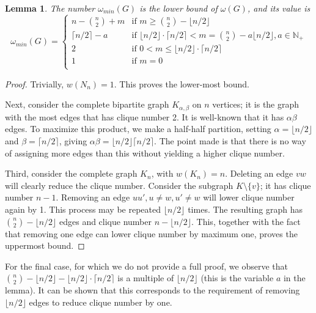 \documentclass[a4paper]{article}
\newtheorem{lemma}{Lemma}
\begin{document}
\begin{lemma}\label{lemma1}
The number $\omega_{min}(G)$ is the lower bound of $\omega(G)$, and its value is
\[
\omega_{min}(G) = 
\begin{cases}
	  n - \binom{n}{2} + m & \text{if } m \geq \binom{n}{2} - \lfloor n/2 \rfloor \\
	  \lceil n / 2 \rceil - a & \text{if }  \lfloor n / 2 \rfloor \cdot \lceil n / 2 \rceil < m = \binom{n}{2} - a \lfloor n/2 \rfloor, a \in \mathbb{N}_+ \\
	  2 & \text{if } 0 < m \leq \lfloor n / 2 \rfloor \cdot \lceil n / 2 \rceil \\
	  1 & \text{if } m = 0 \\
\end{cases}
\]
\end{lemma}

\begin{proof}
 Trivially, $w(N_n) = 1$. This proves the lower-most bound.
 
 Next, consider the complete bipartite graph $K_{\alpha,\beta}$ on $n$ vertices; it is the graph with the most edges that has clique number 2. It is well-known that it has $\alpha \beta$ edges. To maximize this product, we make a half-half partition, setting $\alpha = \lfloor n / 2 \rfloor$ and $\beta = \lceil n / 2 \rceil$, giving $\alpha \beta = \lfloor n / 2 \rfloor \lceil n / 2 \rceil$. The point made is that there is no way of assigning more edges than this without yielding a higher clique number.
 
 Third, consider the complete graph $K_n$, with $w(K_n) = n$. Deleting an edge $vw$ will clearly reduce the clique number. Consider the subgraph $K \setminus \{v\}$; it has clique number $n - 1$. Removing an edge $uu', u \neq w, u' \neq w$ will lower clique number again by 1. This process may be repeated $\lfloor n / 2 \rfloor$ times. The resulting graph has $\binom{n}{2} - \lfloor n/2 \rfloor$ edges and clique number $n - \lfloor n/2 \rfloor$. This, together with the fact that removing one edge can lower clique number by maximum one, proves the uppermost bound. 
\end{proof}

For the final case, for which we do not provide a full proof, we observe that $\binom{n}{2} - \lfloor n/2 \rfloor - \lfloor n / 2 \rfloor \cdot \lceil n / 2 \rceil$ is a multiple of $\lfloor n/2 \rfloor$ (this is the variable $a$ in the lemma). It can be shown that this corresponds to the requirement of removing $\lfloor n/2 \rfloor$ edges to reduce clique number by one.
\end{document}
